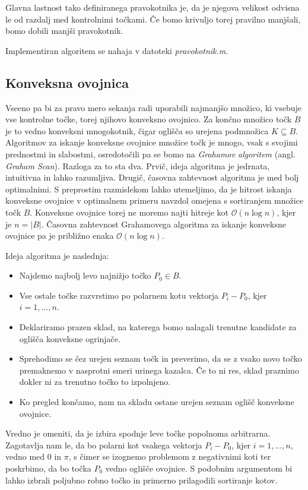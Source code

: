 \documentclass[a4paper, 12pt]{article} %
\begin{document}
Glavna lastnost tako definiranega pravokotnika je, da je njegova velikost odvisna le od razdalj med kontrolnimi točkami. Če bomo krivuljo torej pravilno manjšali, bomo dobili manjši pravokotnik.

Implementiran algoritem se nahaja v datoteki \emph{pravokotnik.m}.

\subsection{Konveksna ovojnica}
Vseeno pa bi za pravo mero sekanja radi uporabili najmanjšo množico, ki vsebuje vse kontrolne točke, torej njihovo konveksno ovojnico. Za končno množico točk $B$ je to vedno konveksni mnogokotnik, čigar oglišča so urejena podmnožica $K \subseteq B$. Algoritmov za iskanje konveksne ovojnice množice točk je mnogo, vsak s svojimi prednostmi in slabostmi, osredotočili pa se bomo na \emph{Grahamov algoritem} (angl. \emph{Graham Scan}). Razloga za to sta dva. Prvič, ideja algoritma je jedrnata, intuitivna in lahko razumljiva. Drugič, časovna zahtevnost algoritma je med bolj optimalnimi. S preprostim razmislekom lahko utemeljimo, da je hitrost iskanja konveksne ovojnice v optimalnem primeru navzdol omejena s sortiranjem množice točk $B$. Konveksne ovojnice torej ne moremo najti hitreje kot $\mathcal{O}(n\log{}n)$, kjer je $n = |B|$. Časovna zahtevnost Grahamovega algoritma za iskanje konveksne ovojnice pa je približno enaka $\mathcal{O}(n\log{}n)$.

Ideja algoritma je naslednja:
\begin{itemize}
\item Najdemo najbolj levo najnižjo točko $P_0 \in B$.
\item Vse ostale točke razvrstimo po polarnem kotu vektorja $P_i - P_0$, kjer $i = 1, \dots, n$.
\item Deklariramo prazen sklad, na katerega bomo nalagali trenutne kandidate za oglišča konveksne ogrinjače.
\item Sprehodimo se čez urejen seznam točk in preverimo, da se z vsako novo točko premaknemo v nasprotni smeri urinega kazalca. Če to ni res, sklad praznimo dokler ni za trenutno točko to izpolnjeno.
\item Ko pregled končamo, nam na skladu ostane urejen seznam oglišč konveksne ovojnice.
\end{itemize}

Vredno je omeniti, da je izbira spodnje leve točke popolnoma arbitrarna. Zagotavlja nam le, da bo polarni kot vsakega vektorja $P_i - P_0$, kjer $i = 1, \dots, n$, vedno med $0$ in $\pi$, s čimer se izognemo problemom z negativnimi koti ter poskrbimo, da bo točka $P_0$ vedno oglišče ovojnice. S podobnim argumentom bi lahko izbrali poljubno robno točko in primerno prilagodili sortiranje kotov.
\end{document}
